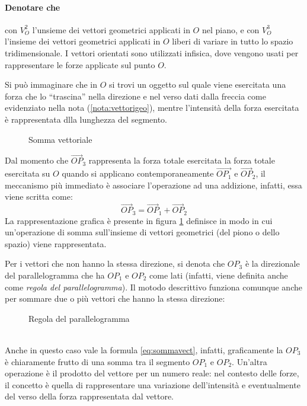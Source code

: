 \paragraph{Denotare che}
con $V_O^2$ l'unsieme dei vettori geometrici applicati in $O$ nel piano, e con $V_O^3$ l'insieme dei vettori geometrici applicati in $O$ liberi di variare in tutto lo spazio tridimensionale. I vettori orientati sono utilizzati infisica, dove vengono usati per rappresentare le forze applicate sul punto $O$.
\begin{es}
  Si può immaginare che in $O$ si trovi un oggetto sul quale viene esercitata una forza che lo ``trascina'' nella direzione e nel verso dati dalla freccia come evidenziato nella nota (\ref{nota:vettorigeo}), mentre l'intensità della forza esercitata è rappresentata dlla lunghezza del segmento.
\begin{figure}[ht!]
  \centering
  \resizebox{7.5cm}{!}{
      
    }
  \caption{Somma vettoriale}
  \label{fig:sommavect}
\end{figure}
Dal momento che $\vec{OP}_3$ rappresenta la forza totale esercitata la forza totale esercitata su $O$ quando si applicano contemporaneamente $\vec{OP_1}$ e $\vec{OP}_2$, il meccanismo più immediato è associare l'operazione ad una addizione, infatti, essa viene scritta come:
\begin{equation}
  \label{eq:sommavect}
  \vec{OP}_3=\vec{OP}_1+\vec{OP}_2
\end{equation}
La rappresentazione grafica è presente in figura \ref{fig:sommavect} definisce in modo in cui un'operazione di somma sull'insieme di vettori geometrici (del piono o dello spazio) viene rappresentata.
\end{es}
Per i vettori che non hanno la stessa direzione, si denota che $OP_3$ è la direzionale del parallelogramma che ha $OP_1$ e $OP_2$ come lati (infatti, viene definita anche come \textit{regola del parallelogramma}). Il motodo descrittivo funziona comunque anche per sommare due o più vettori che hanno la stessa direzione:
\begin{figure}[ht!]
  \centering
  \resizebox{9cm}{!}{
      
    }
  \caption{Regola del parallelogramma}
  \label{fig:metparallelogramma}
\end{figure}\\
Anche in questo caso vale la formula \ref{eq:sommavect}, infatti, graficamente la $OP_3$ è chiaramente frutto di una somma tra il segmento $OP_1$ e $OP_2$. Un'altra operazione è il prodotto del vettore per un numero reale: nel contesto delle forze, il concetto è quella di rappresentare una variazione dell'intensità e eventualmente del verso della forza rappresentata dal vettore.\\
